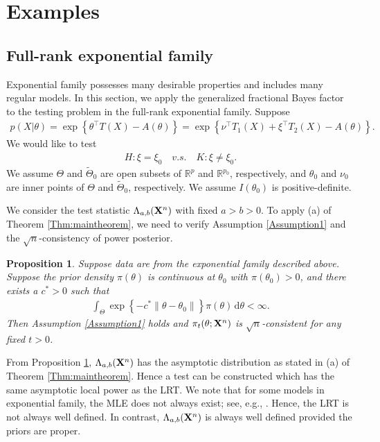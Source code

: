 \documentclass[11pt]{article}
\theoremstyle{plain}
\newtheorem{proposition}{\quad\quad Proposition}
\theoremstyle{definition}
\theoremstyle{remark}
\begin{document}
    \section{Examples}

\subsection{Full-rank exponential family}
Exponential family possesses many desirable properties and includes many regular models.
In this section, we apply the generalized fractional Bayes factor to the testing problem in the full-rank exponential family.
Suppose 
\begin{align*}
    p(X|\theta)
    =\exp \left\{ \theta^\top  T(X)-A(\theta) \right\}
    =\exp \left\{ \nu^\top  T_1(X) + \xi^\top T_2 (X) -A(\theta) \right\}
    .
\end{align*}
We would like to test
\begin{align*}
    H:\xi= \xi_0 \quad v.s.\quad K: \xi\neq \xi_0. 
\end{align*}
We assume $\Theta$ and $\tilde{\Theta}_0$ are open subsets of $\mathbb{R}^p$ and $\mathbb R^{p_0}$, respectively,
and $\theta_0$ and $\nu_0$ are inner points of $\Theta$ and $\tilde{\Theta}_0$, respectively.
We assume $I(\theta_0)$ is positive-definite.

We consider the test statistic $\Lambda_{a,b}(\mathbf{X}^n)$ with fixed $a>b> 0$.
To apply (a) of Theorem \ref{Thm:maintheorem},
we need to verify Assumption \ref{Assumption1} and the $\sqrt n$-consistency of power posterior.
\begin{proposition}\label{exponentialCon}
    Suppose data are from the exponential family described above.
    Suppose the prior density $\pi(\theta)$ is continuous at $\theta_0$ with $\pi(\theta_0) > 0$, and there exists a $c^* > 0$ such that
    \begin{align*}
        \int_{\Theta} 
        \exp\left\{- c^* \|\theta-\theta_0\|  \right\}
        \pi(\theta)\, \mathrm d\theta
        < \infty
        .
    \end{align*}
    Then Assumption \ref{Assumption1} holds and $\pi_{t}(\theta ;\mathbf{X}^{n})$ is $\sqrt n$-consistent for any fixed $t>0$.
\end{proposition}
From Proposition \ref{exponentialCon}, $\Lambda_{a,b}(\mathbf{X}^n)$ has the asymptotic distribution as stated in (a) of Theorem \ref{Thm:maintheorem}.
Hence a test can be constructed which has the same asymptotic local power as the LRT.
We note that for some models in exponential family, the MLE does not always exist; see, e.g., \cite{Rinaldo2013}.
Hence, the LRT is not always well defined.
In contrast, $\Lambda_{a,b}(\mathbf{X}^n)$ is always well defined provided the priors are proper.
\end{document}
